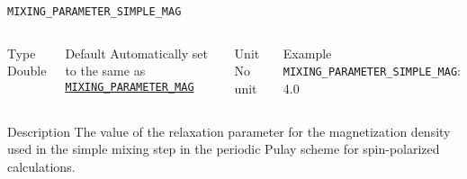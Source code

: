 \begin{frame}[allowframebreaks]{\texttt{MIXING\_PARAMETER\_SIMPLE\_MAG}} \label{MIXING_PARAMETER_SIMPLE_MAG}
\vspace*{-12pt}
\begin{columns}
\begin{block}{Type}
Double
\end{block}

\begin{block}{Default}
Automatically set to the same as \hyperlink{MIXING_PARAMETER_MAG}{\texttt{MIXING\_PARAMETER\_MAG}}
\end{block}

\begin{block}{Unit}
No unit
\end{block}

\begin{block}{Example}
\texttt{MIXING\_PARAMETER\_SIMPLE\_MAG}: 4.0
\end{block}
\end{columns}

\begin{block}{Description}
The value of the relaxation parameter for the magnetization density used in the simple mixing step in the periodic Pulay scheme for spin-polarized calculations.
\end{block}

\end{frame}




